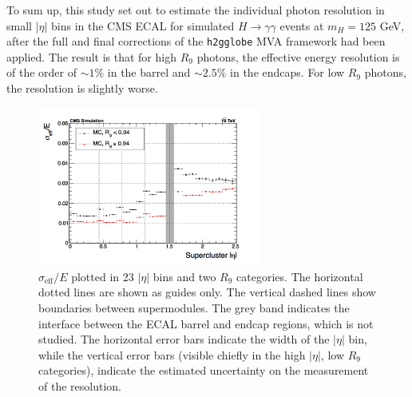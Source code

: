\documentclass[10pt]{article}
\begin{document}
To sum up, this study set out to estimate the individual photon resolution in small $|\eta|$ bins in the CMS ECAL for simulated $H \rightarrow \gamma \gamma$ events at $m_H =125$ GeV, after the full and final corrections of the \texttt{h2gglobe} MVA framework had been applied. The result is that for high $R_9$ photons, the effective energy resolution is of the order of $\sim 1\%$ in the barrel and $\sim 2.5\%$ in the endcaps. For low $R_9$ photons, the resolution is slightly worse.

\begin{figure}[h!]
\centering
\includegraphics[width=0.65\textwidth]{"EffSigma_vs_eta_mva"}
\caption{$\sigma_{\text{eff}}/E$ plotted in 23 $|\eta|$ bins and two $R_9$ categories. The horizontal dotted lines are shown as guides only. The vertical dashed lines show boundaries between supermodules. The grey band indicates the interface between the ECAL barrel and endcap regions, which is not studied. The horizontal error bars indicate the width of the $|\eta|$ bin, while the vertical error bars (visible chiefly in the high $|\eta|$, low $R_{9}$ categories), indicate the estimated uncertainty on the measurement of the resolution.}
\label{mainPlot}
\end{figure}
\end{document}
